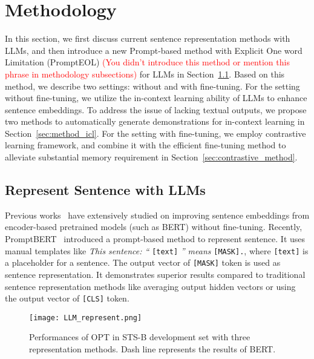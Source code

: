 \documentclass{article}
\begin{document}
\section{Methodology}
In this section, we first discuss current sentence representation methods with LLMs, and then introduce a new Prompt-based method with Explicit One word Limitation (PromptEOL) \textcolor{red}{(You didn't introduce this method or mention this phrase in methodology subsections)} for LLMs in Section~\ref{sec:represent_llm}.
Based on this method, we describe two settings: without and with fine-tuning.
For the setting without fine-tuning,
we utilize the in-context learning ability of LLMs to enhance sentence embeddings.
To address the issue of lacking textual outputs, we propose two methods to automatically generate demonstrations for in-context learning in Section~\ref{sec:method_icl}.
For the setting with fine-tuning, we employ contrastive learning framework, and combine it with the efficient fine-tuning method to alleviate substantial memory requirement in Section~\ref{sec:contrastive_method}.


\subsection{Represent Sentence with LLMs}
\label{sec:represent_llm}
Previous works~\cite{li2020sentence, su2021whitening, jiang2022promptbert} have extensively studied on improving sentence embeddings from encoder-based pretrained models (such as BERT) without fine-tuning.
Recently, PromptBERT~\cite{jiang2022promptbert} introduced a prompt-based method to represent sentence.
It uses manual templates like \textit{This sentence: ``} \texttt{[text]} \textit{'' means} \texttt{[MASK].}, where \texttt{[text]} is a placeholder for a sentence. The output vector of \texttt{[MASK]} token is used as sentence representation.
It demonstrates superior results compared to traditional sentence representation methods like averaging output hidden vectors or using the output vector of \texttt{[CLS]} token.

\begin{wrapfigure}[20]{r}{7cm}\centering
\vspace{-10pt}
	\texttt{[image: LLM\_represent.png]}
\caption{
  Performances of OPT in STS-B development set with three representation methods.
  Dash line represents the results of BERT. }
\label{fig:LLM_rep}
\end{wrapfigure}
\end{document}
